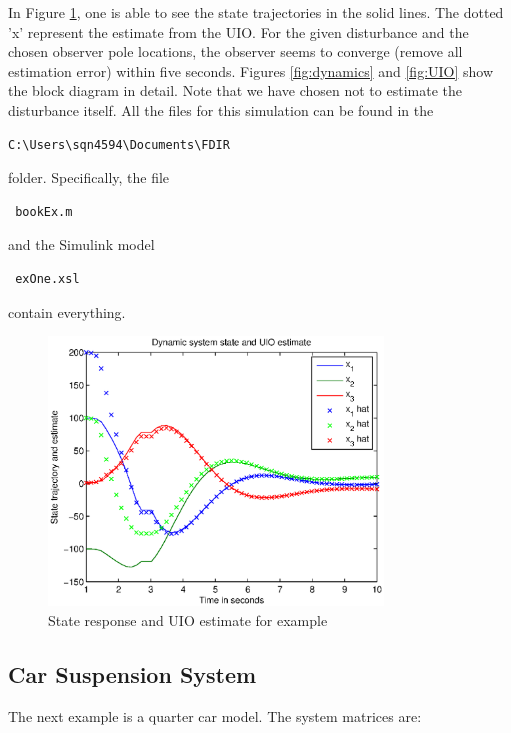 \documentclass{amsart}
\theoremstyle{definition}
\theoremstyle{remark}
\numberwithin{equation}{section}
\begin{document}
In Figure \ref{fig: resultsofUIO}, one is able to see the state trajectories in the solid lines.  The dotted 'x' represent the estimate from the UIO.  For the given disturbance and the chosen observer pole locations, the observer seems to converge (remove all estimation error) within five seconds.  Figures \ref{fig:dynamics} and \ref{fig:UIO} show the block diagram in detail.  Note that we have chosen not to estimate the disturbance itself. All the files for this simulation can be found in the \color{lightgray}\begin{verbatim}C:\Users\sqn4594\Documents\FDIR \end{verbatim}\color{black} folder. Specifically, the file \begin{verbatim} bookEx.m \end{verbatim} and the Simulink model \begin{verbatim} exOne.xsl \end{verbatim} contain everything.
\begin{figure} [H]
    \centering
    \includegraphics [width=3.5in]{bookEx_01.eps}
    \caption{State response and UIO estimate for example}
    \label{fig: resultsofUIO}
\end{figure}

\subsection{Car Suspension System}\label{ex:ex2}
The next example is a quarter car model.  The system matrices are:
\end{document}
